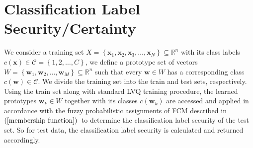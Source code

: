 \documentclass[english]{HSMW-Thesis}
\begin{document}
%		
%	

\newpage

\section{Classification Label Security/Certainty}

We consider a training set\hspace{2pt} $X=\left\lbrace \mathbf{x}_1,\mathbf{x}_2,\mathbf{x}_3,\ldots,\mathbf{x}_N\right\rbrace \subseteq \mathbb{R}^n$\hspace{2pt} with its class labels\hspace{2pt} $c\left( \mathbf{x}\right)\in\mathcal{C}=\left\lbrace 1,2,\ldots, C\right\rbrace $,\hspace{2pt} we define a prototype set of vectors\hspace{2pt} $W=\left\lbrace \mathbf{w}_1,\mathbf{w}_2,\ldots,\mathbf{w}_M\right\rbrace\subseteq \mathbb{R}^n $\hspace{2pt} such that every\hspace{2pt} $\mathbf{w}\in W$ \hspace{2pt}has a corresponding class \hspace{2pt}$c\left( \mathbf{w}\right)\in\mathcal{C}$.\hspace{2pt} We divide the training set into the train and test sets, respectively. Using the train set along with standard LVQ training procedure, the learned prototypes \hspace{2pt}$\mathbf{w}_{k}\in W$ \hspace{2pt}together with its classes \hspace{2pt}$c\left( \mathbf{w}_{k} \right) $ \hspace{2pt} are accessed and applied in accordance with the fuzzy probabilistic assignments of FCM described in $\left( \ref{membership function}\right) $\ to determine the classification label security of the test set. So for test data, the classification label security is calculated and returned accordingly. 
\end{document}
